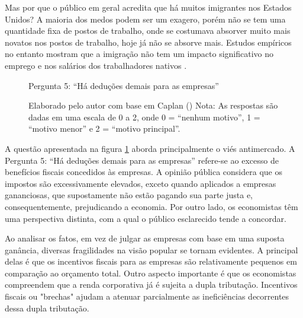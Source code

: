 Mas por que o público em geral acredita que há muitos imigrantes nos Estados Unidos? A maioria dos medos podem ser um exagero, porém não se tem uma quantidade fixa de postos de trabalho, onde se costumava absorver muito mais novatos nos postos de trabalho, hoje já não se absorve mais. Estudos empíricos no entanto mostram que a imigração não tem um impacto significativo no emprego e nos salários dos trabalhadores nativos \cite{economics-immigration}.





\begin{figure}[H]
    \centering
    \caption*{Pergunta 5: “Há deduções demais para as empresas”}
    \caption{Elaborado pelo autor com base em Caplan (\citeyear{The_Myth_of_the_Rational_Voter}) \newline
    Nota: As respostas são dadas em uma escala de 0 a 2, onde 0 = “nenhum motivo”, 1 = “motivo menor” e 2 = “motivo principal”.}
    \label{fig:pergunta_5}
\end{figure}


A questão apresentada na figura \ref{fig:pergunta_5} aborda principalmente o viés antimercado. A Pergunta 5: “Há deduções demais para as empresas” refere-se ao excesso de benefícios fiscais concedidos às empresas. A opinião pública considera que os impostos são excessivamente elevados, exceto quando aplicados a empresas gananciosas, que supostamente não estão pagando sua parte justa e, consequentemente, prejudicando a economia. Por outro lado, os economistas têm uma perspectiva distinta, com a qual o público esclarecido tende a concordar.

Ao analisar os fatos, em vez de julgar as empresas com base em uma suposta ganância, diversas fragilidades na visão popular se tornam evidentes. A principal delas é que os incentivos fiscais para as empresas são relativamente pequenos em comparação ao orçamento total. Outro aspecto importante é que os economistas compreendem que a renda corporativa já é sujeita a dupla tributação. Incentivos fiscais ou "brechas" ajudam a atenuar parcialmente as ineficiências decorrentes dessa dupla tributação.

